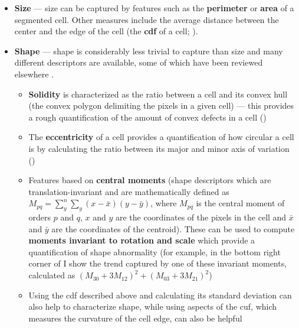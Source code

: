 \begin{itemize}
    \item \textbf{Size} --- size can be captured by features such as the \textbf{perimeter} or \textbf{area} of a segmented cell. Other measures include the average distance between the center and the edge of the cell (the \textbf{\ac{cdf}} of a cell; ).
    \item \textbf{Shape} --- shape is considerably less trivial to capture than size and many different descriptors are available, some of which have been reviewed elsewhere \cite{Mingqiang2008-wv}. 
    \begin{itemize}
        \item \textbf{Solidity} is characterized as the ratio between a cell and its convex hull (the convex polygon delimiting the pixels in a given cell) --- this provides a rough quantification of the amount of convex defects in a cell  ()
        \item The \textbf{eccentricity} of a cell provides a quantification of how circular a cell is by calculating the ratio between its major and minor axis of variation ()
        \item Features based on \textbf{central moments} (shape descriptors which are translation-invariant and are mathematically defined as $M_{pq} = \sum_y^n\sum_y(x-\bar{x})(y-\bar{y})$, where $M_{pq}$ is the central moment of orders $p$ and $q$, $x$ and $y$ are the coordinates of the pixels in the cell and $\bar{x}$ and $\bar{y}$ are the coordinates of the centroid). These can be used to compute \textbf{moments invariant to rotation and scale} which provide a quantification of shape abnormality \cite{Mingqiang2008-wv} (for example, in the bottom right corner of  I show the trend captured by one of these invariant moments, calculated as $(M_{30} + 3 M_{12})^2 + (M_{03} + 3 M_{21})^2$)
        \item Using the \ac{cdf} described above and calculating its standard deviation can also help to characterize shape, while using aspects of the \ac{cuf}, which measures the curvature of the cell edge, can also be helpful

\end{itemize}
\end{itemize}
